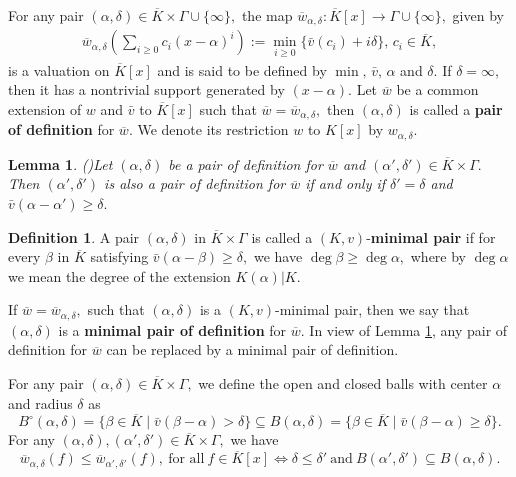 \documentclass[11pt]{amsart}
\newtheorem{lemma}[theorem]{Lemma}
\theoremstyle{definition}
\newtheorem{definition}[theorem]{Definition}
\theoremstyle{remark}
\numberwithin{equation}{section}
\begin{document}
For any pair $(\alpha,\delta)\in\overline{K}\times\Gamma\cup\{\infty\},$ the map $\overline{w}_{\alpha,\delta}: \overline{K}[x]\longrightarrow \Gamma\cup\{\infty\},$ given by
	\begin{align*}
		\overline{w}_{\alpha,\delta}\left(\sum_{i\geq 0} c_i (x-\alpha)^i\right):=\min_{i\geq 0}\{\bar{v}(c_i)+i\delta\}, \, c_i\in\overline{K},
	\end{align*}
	is a valuation on $\overline{K}[x]$ and is said to be defined by $\min,\, \bar{v},\, \alpha$ and $\delta.$ If $\delta=\infty,$ then it has a nontrivial support generated by $(x-\alpha).$
		Let $\overline{w}$ be a common extension of $w$ and $\bar{v}$ to $\overline{K}[x]$ such that $\overline{w}=\overline{w}_{\alpha,\delta},$ then $(\alpha,\delta)$ is called a {\bf pair of definition} for $\overline{w}.$ We denote its restriction $w$ to $K[x]$ by $w_{\alpha,\delta}.$
	\begin{lemma}(\cite[Lemma 2.4]{W})\label{il1}
		Let $(\alpha,\delta)$ be a pair of definition for $\overline{w}$ and $(\alpha',\delta')\in \overline{K}\times\Gamma.$ Then $(\alpha',\delta')$ is also a pair of definition for $\overline{w}$ if and only if $\delta'=\delta$ and $\bar{v}(\alpha-\alpha')\geq \delta.$
	\end{lemma}
	
	\begin{definition}
	A pair $(\alpha,\delta)$ in $\overline{K}\times \Gamma$ is called  a $(K,v)$-{\bf minimal pair} if for every $\beta$ in $\overline{K}$ satisfying $\bar{v}(\alpha-\beta)\geq\delta,$ we have  $\deg\beta\geq\deg\alpha,$ where by $\deg\alpha$ we mean the degree of the extension $K(\alpha)|K.$  
\end{definition}

 If $\overline{w}=\overline{w}_{\alpha,\delta},$ such that $(\alpha,\delta)$ is a $(K,v)$-minimal pair, then we say that $(\alpha,\delta)$ is a {\bf minimal pair of definition} for $\overline{w}.$ In view of Lemma \ref{il1}, any pair of definition for $\overline{w}$ can be replaced by a minimal pair of definition.

 For any pair $(\alpha,\delta)\in\overline{K}\times\Gamma,$ we define the open and closed balls with center $\alpha$ and radius $\delta$ as\[B^\circ(\alpha,\delta)=\{\beta\in\overline{K}\mid\bar{v}(\beta-\alpha)> \delta\}\subseteq B(\alpha,\delta)=\{\beta\in\overline{K}\mid\bar{v}(\beta-\alpha)\geq \delta\}.\]
For any $(\alpha,\delta), (\alpha',\delta')\in \overline{K}\times\Gamma,$ we have \[\overline{w}_{\alpha,\delta}(f)\leq \overline{w}_{\alpha',\delta'}(f),\ \text{for all} \ f\in\overline{K}[x]\iff \delta\leq \delta' \ \text{and} \ B(\alpha',\delta')\subseteq B(\alpha,\delta).\]
\end{document}
